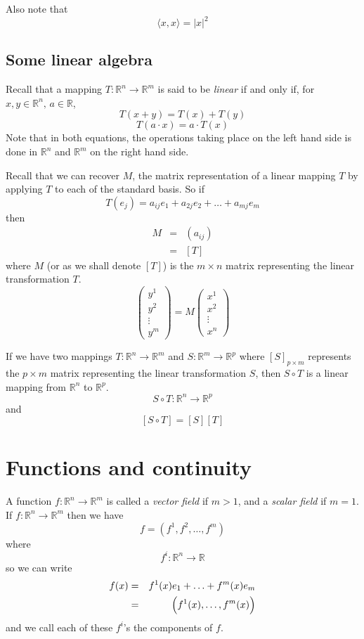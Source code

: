 \documentclass[a4paper,14pt]{extarticle}
\theoremstyle{definition}
\begin{document}
Also note that \[\langle x,x\rangle = |x|^2\]

\subsection{Some linear algebra}
Recall that a mapping $T:\mathbb{R}^n\rightarrow\mathbb{R}^m$ is said to be \emph{linear} if and only if, for $x,y\in\mathbb{R}^n, \,a\in\mathbb{R}$,
\[T(x+y)=T(x)+T(y)\]\[T(a\cdot  x)=a\cdot T(x)\] Note that in both equations, the operations taking place on the left hand side is done in $\mathbb{R}^n$ and $\mathbb{R}^m$
on the right hand side.

\noindent Recall that we can recover $M$, the matrix representation of a linear mapping $T$ by applying $T$ to each of the standard basis. So if
\[T(e_j)=a_{ij}e_1+a_{2j}e_2+\ldots+a_{mj}e_m\]
then
\begin{eqnarray*}
	M&=&(a_{ij}) \\
	&=&[T]
\end{eqnarray*}
where $M$ (or as we shall denote $[T]$) is the $m\times n$ matrix representing the linear transformation $T$.
\[\begin{pmatrix}y^1\\y^2\\\vdots\\y^m\end{pmatrix}=M\begin{pmatrix}x^1\\x^2\\\vdots\\x^n\end{pmatrix}\]

\noindent If we have two mappings $T:\mathbb{R}^n\rightarrow\mathbb{R}^m$ and $S:\mathbb{R}^m\rightarrow\mathbb{R}^p$ where $[S]_{p\times m}$ represents the
$p\times m$ matrix representing the linear transformation $S$, then $S\circ T$ is a linear mapping from $\mathbb{R}^n$ to $\mathbb{R}^p$.
\[S\circ T:\mathbb{R}^n\rightarrow\mathbb{R}^p\] and \[[S\circ T]=[S][T]\]

\section{Functions and continuity}
A function $f:\mathbb{R}^n\rightarrow\mathbb{R}^m$ is called a \emph{vector field} if $m>1$, and a \emph{scalar field} if $m=1$. \\

If $f:\mathbb{R}^n\rightarrow\mathbb{R}^m$ then we have \[f=(f^1,f^2,\ldots,f^m)\] where \[f^i:\mathbb{R}^n\rightarrow\mathbb{R}\] so we can write
\begin{eqnarray*}
	f(x)&=&f^1(x)e_1+\ldots+f^m(x)e_m \\
		&=&\Bigl(f^1(x),\ldots,f^m(x)\Bigr)
\end{eqnarray*}
and we call each of these $f^i$'s the components of $f$.
\end{document}
